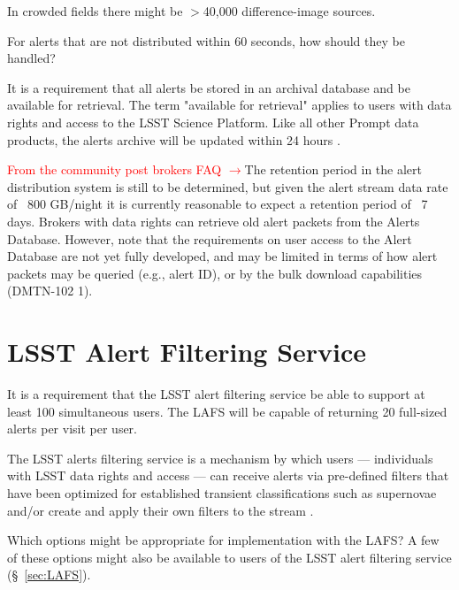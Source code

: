 \documentclass[DM,lsstdraft,authoryear,toc]{lsstdoc}
\begin{document}
In crowded fields there might be $>$40,000 difference-image sources.

For alerts that are not distributed within 60 seconds, how should they be handled? 

It is a requirement that all alerts be stored in an archival database and be available for retrieval. The term "available for retrieval" applies to users with data rights and access to the LSST Science Platform. Like all other Prompt data products, the alerts archive will be updated within 24 hours .

\textcolor{red}{From the community post brokers FAQ $\rightarrow$}The retention period in the alert distribution system is still to be determined, but given the alert stream data rate of ~800 GB/night it is currently reasonable to expect a retention period of ~7 days. Brokers with data rights can retrieve old alert packets from the Alerts Database. However, note that the requirements on user access to the Alert Database are not yet fully developed, and may be limited in terms of how alert packets may be queried (e.g., alert ID), or by the bulk download capabilities (DMTN-102 1).

\section{LSST Alert Filtering Service}\label{sec:lafs}

It is a requirement that the LSST alert filtering service be able to support at least 100 simultaneous users. The LAFS will be capable of returning 20 full-sized alerts per visit per user.

The LSST alerts filtering service is a mechanism by which users --- individuals with LSST data rights and access --- can receive alerts via pre-defined filters that have been optimized for established transient classifications such as supernovae and/or create and apply their own filters to the stream . 

Which options might be appropriate for implementation with the LAFS?
A few of these options might also be available to users of the LSST alert filtering service (\S~\ref{sec:LAFS}).



\end{document}
